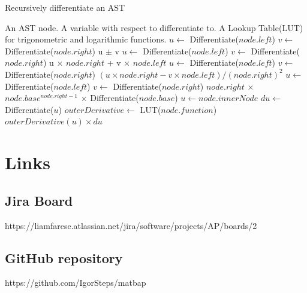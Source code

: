 \documentclass[a4paper, oneside, 11pt]{report}
\begin{document}
\begin{algorithm}
\begin{algorithmic}[1]
\caption{Recursively differentiate an AST}
\label{algorithm-differentiate}
\STATE An AST node.
\STATE A variable with respect to differentiate to.
\STATE A Lookup Table(LUT) for trigonometric and logarithmic functions.
        \STATE {}
        \STATE {}
        \STATE {}
            \STATE $u \gets$ {Differentiate}({$node.left$})
            \STATE $v \gets$ {Differentiate}({$node.right$})
            \STATE \RETURN u $\pm$ v
            \STATE $u \gets$ {Differentiate}({$node.left$})
            \STATE $v \gets$ {Differentiate}({$node.right$})
            \STATE \RETURN u $\times$ $node.right$ + v $\times$ $node.left$ 
            \STATE $u \gets$ {Differentiate}({$node.left$})
            \STATE $v \gets$ {Differentiate}({$node.right$})
            \STATE \RETURN $(u \times node.right - v \times node.left) / (node.right)^2$
            \STATE $u \gets$ {Differentiate}({$node.left$})
            \STATE $v \gets$ {Differentiate}({$node.right$})
            \STATE \RETURN $node.right$ $\times$ $node.base^{node.right-1}$ $\times$ {Differentiate}({$node.base$})
        \ENDIF
        \STATE $u \gets node.innerNode$
        \STATE $du \gets$ {Differentiate}({$u$})
        \STATE $outerDerivative \gets$ {LUT}({$node.function$})
        \STATE \RETURN $outerDerivative(u) \times du$
    \ENDIF
    
\end{algorithmic}
\end{algorithm}

\chapter{Links}
\label{app:links}
\section{Jira Board}
https://liamfarese.atlassian.net/jira/software/projects/AP/boards/2
\label{ap-jira-link}

\section{GitHub repository}
https://github.com/IgorSteps/matbap
\label{github-repo}
\end{document}
